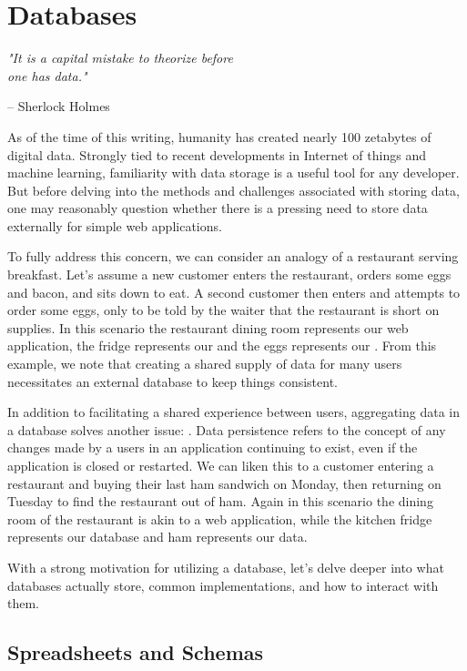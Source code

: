 \setchapterpreamble[u]{\margintoc}
\chapter{Databases}
\epigraph{\emph{"It is a capital mistake to theorize before  \\ one has data."}}{ -- Sherlock Holmes}

As of the time of this writing, humanity has created nearly 100 zetabytes of digital data. Strongly tied to recent developments in Internet of things and machine learning, familiarity with data storage is a useful tool for any developer. But before delving into the methods and challenges associated with storing data, one may reasonably question whether there is a pressing need to store data externally for simple web applications. 

To fully address this concern, we can consider an analogy of a restaurant serving breakfast. Let's assume a new customer enters the restaurant, orders some eggs and bacon, and sits down to eat. A second customer then enters and attempts to order some eggs, only to be told by the waiter that the restaurant is short on supplies. In this scenario the restaurant dining room represents our web application, the fridge represents our  and the eggs represents our . From this example, we note that creating a shared supply of data for many users necessitates an external database to keep things consistent. 


In addition to facilitating a shared experience between users, aggregating data in a database solves another issue: . Data persistence refers to the concept of any changes made by a users in an application continuing to exist, even if the application is closed or restarted. We can liken this to a customer entering a restaurant and buying their last ham sandwich on Monday, then returning on Tuesday to find the restaurant out of ham. Again in this scenario the dining room of the restaurant is akin to a web application, while the kitchen fridge represents our database and ham represents our data. 

With a strong motivation for utilizing a database, let's delve deeper into what databases actually store, common implementations, and how to interact with them.


\section{ Spreadsheets and Schemas }

